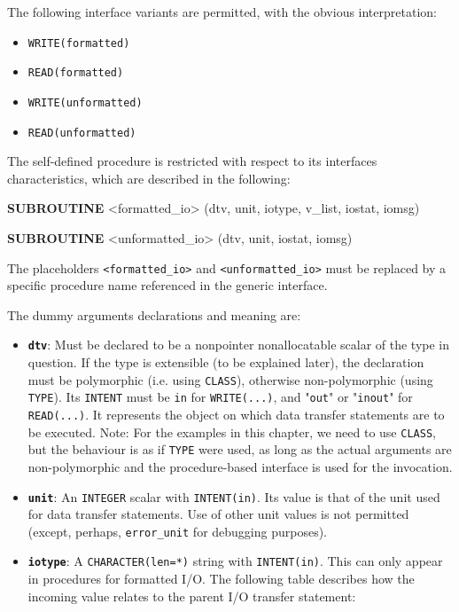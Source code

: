 \documentclass[
]{scrartcl}
\newenvironment{Shaded}{}{}
\newcommand{\KeywordTok}[1]{\textcolor[rgb]{0.00,0.44,0.13}{\textbf{#1}}}
\newcommand{\NormalTok}[1]{#1}
\newcommand{\OperatorTok}[1]{\textcolor[rgb]{0.40,0.40,0.40}{#1}}
\providecommand{\tightlist}{%
  \setlength{\itemsep}{0pt}\setlength{\parskip}{0pt}}
\begin{document}
The following interface variants are permitted, with the obvious
interpretation:

\begin{itemize}
\tightlist
\item
  \texttt{WRITE(formatted)}
\item
  \texttt{READ(formatted)}
\item
  \texttt{WRITE(unformatted)}
\item
  \texttt{READ(unformatted)}
\end{itemize}

The self-defined procedure is restricted with respect to its
interfaces\textquotesingle{} characteristics, which are described in the
following:

\begin{Shaded}
\begin{Highlighting}[]
\KeywordTok{SUBROUTINE} \OperatorTok{\textless{}}\NormalTok{formatted\_io}\OperatorTok{\textgreater{}}\NormalTok{    (dtv, unit, iotype, v\_list, iostat, iomsg)}

\KeywordTok{SUBROUTINE} \OperatorTok{\textless{}}\NormalTok{unformatted\_io}\OperatorTok{\textgreater{}}\NormalTok{  (dtv, unit,                 iostat, iomsg)}
\end{Highlighting}
\end{Shaded}

The placeholders \texttt{\textless{}formatted\_io\textgreater{}} and
\texttt{\textless{}unformatted\_io\textgreater{}} must be replaced by a
specific procedure name referenced in the generic interface.

The dummy arguments\textquotesingle{} declarations and meaning are:

\begin{itemize}
\tightlist
\item
  \textbf{\texttt{dtv}}: Must be declared to be a nonpointer
  nonallocatable scalar of the type in question. If the type is
  extensible (to be explained later), the declaration must be
  polymorphic (i.e. using \texttt{CLASS}), otherwise non-polymorphic
  (using \texttt{TYPE}). Its \texttt{INTENT} must be \texttt{in} for
  \texttt{WRITE(...)}, and "\texttt{out}" or "\texttt{inout}" for
  \texttt{READ(...)}. It represents the object on which data transfer
  statements are to be executed. Note: For the examples in this chapter,
  we need to use \texttt{CLASS}, but the behaviour is as if
  \texttt{TYPE} were used, as long as the actual arguments are
  non-polymorphic and the procedure-based interface is used for the
  invocation.
\item
  \textbf{\texttt{unit}}: An \texttt{INTEGER} scalar with
  \texttt{INTENT(in)}. Its value is that of the unit used for data
  transfer statements. Use of other unit values is not permitted
  (except, perhaps, \texttt{error\_unit} for debugging purposes).
\item
  \textbf{\texttt{iotype}}: A \texttt{CHARACTER(len=*)} string with
  \texttt{INTENT(in)}. This can only appear in procedures for formatted
  I/O. The following table describes how the incoming value relates to
  the parent I/O transfer statement:
\end{itemize}
\end{document}
